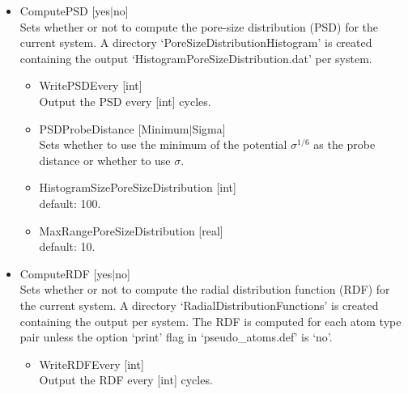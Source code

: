 \begin{itemize}
\item{ComputePSD [yes$|$no]}\\
Sets whether or not to compute the pore-size distribution (PSD) for the current system.
A directory `PoreSizeDistributionHistogram' is created containing the output 
`HistogramPoreSizeDistribution.dat' per system.
\begin{itemize}
\item{WritePSDEvery [int]}\\
Output the PSD every [int] cycles.
\item{PSDProbeDistance [Minimum$|$Sigma]}\\
Sets whether to use the minimum of the potential $\sigma^{1/6}$ as the probe distance or whether to use $\sigma$.
\item{HistogramSizePoreSizeDistribution [int]}\\
default: 100.
\item{MaxRangePoreSizeDistribution [real]}\\
default: 10.
\end{itemize}


\item{ComputeRDF [yes$|$no]}\\
Sets whether or not to compute the radial distribution function (RDF) for the current system.
A directory `RadialDistributionFunctions' is created containing the output per system.
The RDF is computed for each atom type pair unless the option `print' flag in `pseudo\_atoms.def'
is `no'.
\begin{itemize}
\item{WriteRDFEvery [int]}\\
Output the RDF every [int] cycles.
\end{itemize}


\end{itemize}
